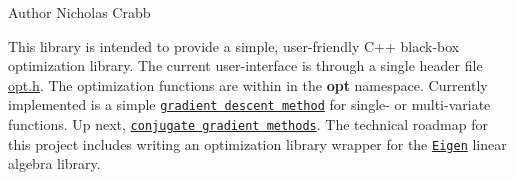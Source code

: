 \begin{DoxyAuthor}{Author}
Nicholas Crabb
\end{DoxyAuthor}
This library is intended to provide a simple, user-\/friendly C++ black-\/box optimization library. The current user-\/interface is through a single header file \mbox{\hyperlink{opt_8h_source}{opt.\+h}}. The optimization functions are within in the {\bfseries opt} namespace. Currently implemented is a simple \href{https://en.wikipedia.org/wiki/Gradient_descent}{\tt gradient descent method} for single-\/ or multi-\/variate functions. Up next, \href{https://en.wikipedia.org/wiki/Conjugate_gradient_method}{\tt conjugate gradient methods}. The technical roadmap for this project includes writing an optimization library wrapper for the \href{http://eigen.tuxfamily.org/index.php?title=Main_Page}{\tt Eigen} linear algebra library. 